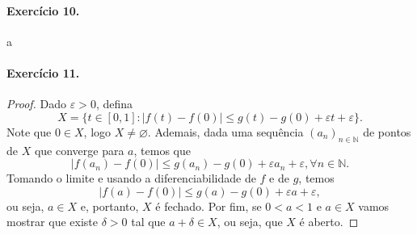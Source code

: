 \documentclass[12pt,a4paper]{article}
\newcommand{\N}{\mathbb{N}}
\begin{document}
\paragraph{Exercício 10.}
    a
\paragraph{Exercício 11.}
    \begin{proof}
        Dado $\varepsilon > 0$, defina
        \begin{equation*}
            X = \{ t\in [0,1] : |f(t) - f(0)| \leq g(t) - g(0) + 
                                              \varepsilon t + \varepsilon \}.
        \end{equation*}
        Note que $0\in X$, logo $X\neq\varnothing$. Ademais, dada uma sequência
        $(a_n)_{n\in\N}$ de pontos de $X$ que converge para $a$, temos que
        \begin{equation*}
            |f(a_n) - f(0)| \leq g(a_n) - g(0) + \varepsilon a_n + \varepsilon, 
            \forall n\in\N.
        \end{equation*}
        Tomando o limite e usando a diferenciabilidade de $f$ e de $g$, temos
        \begin{equation*}
            |f(a) - f(0)| \leq g(a) - g(0) + \varepsilon a + \varepsilon,
        \end{equation*}
        ou seja, $a\in X$ e, portanto, $X$ é fechado. Por fim, se
        $0 < a < 1$ e $a\in X$ vamos mostrar que existe $\delta > 0$
        tal que $a + \delta \in X$, ou seja, que $X$ é aberto.
    \end{proof}
\end{document}
